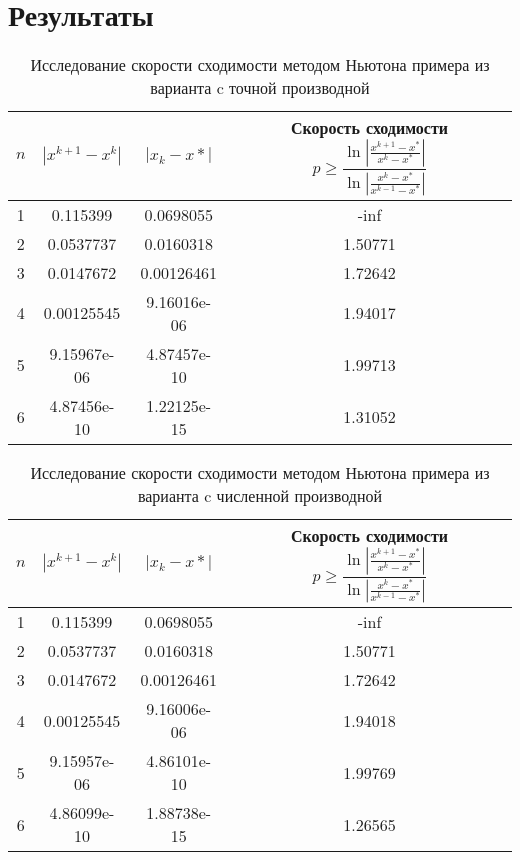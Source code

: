 \documentclass{article}
\begin{document}
    \section{Результаты}
    \begin{table}[H]
        \centering
        \caption{Исследование скорости сходимости методом Ньютона примера из варианта c точной производной}
        \begin{tabular}{|c|c|c|c|}
            \hline
            $n$ & $|x^{k+1} - x^k|$ & $ |x_k - x*|$ & Скорость сходимости $p \geqslant \dfrac{\ln | \frac{x^{k+1}-x^*}{x^k - x^*} |}{\ln |\frac{x^k -x^*}{x^{k-1} - x^*}|}$ \\
            \hline 
            1 & 0.115399 & 0.0698055 & -inf \\ \hline
            2 & 0.0537737 & 0.0160318 & 1.50771 \\ \hline
            3 & 0.0147672 & 0.00126461 & 1.72642 \\ \hline
            4 & 0.00125545 & 9.16016e-06 & 1.94017 \\ \hline
            5 & 9.15967e-06 & 4.87457e-10 & 1.99713 \\ \hline
            6 & 4.87456e-10 & 1.22125e-15 & 1.31052 \\ \hline

        \end{tabular}
    \end{table}
    \begin{table}[H]
        \centering
        \caption{Исследование скорости сходимости методом Ньютона примера из варианта c численной производной}
        \begin{tabular}{|c|c|c|c|}
            \hline
            $n$ & $|x^{k+1} - x^k|$ & $ |x_k - x*|$ & Скорость сходимости $p \geqslant \dfrac{\ln | \frac{x^{k+1}-x^*}{x^k - x^*} |}{\ln |\frac{x^k -x^*}{x^{k-1} - x^*}|}$ \\
            \hline 
            1 & 0.115399 & 0.0698055 & -inf \\ \hline
            2 & 0.0537737 & 0.0160318 & 1.50771 \\ \hline
            3 & 0.0147672 & 0.00126461 & 1.72642 \\ \hline
            4 & 0.00125545 & 9.16006e-06 & 1.94018 \\ \hline
            5 & 9.15957e-06 & 4.86101e-10 & 1.99769 \\ \hline
            6 & 4.86099e-10 & 1.88738e-15 & 1.26565 \\ \hline
        \end{tabular}
    \end{table}
\end{document}
